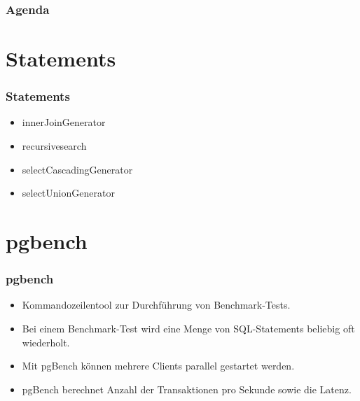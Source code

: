 \documentclass[hyperref={pdfpagelabels=false}]{beamer}
\author{Jennifer Wittling, Rolf Kimmelmann, Jan Löffelsender}
\title{\tit}
\begin{document}

	\begin{frame}
	\titlepage
	\end{frame} 

	\begin{frame}
	\frametitle{Agenda}
	\hypertarget{tableofcontent}{}
	\tableofcontents
	\end{frame}

	\section{Statements}
	\begin{frame}
	\frametitle{Statements}
	\begin{itemize}
		\item innerJoinGenerator
		\item recursivesearch
		\item selectCascadingGenerator
		\item selectUnionGenerator
	\end{itemize}
	\end{frame}

	\section{pgbench}
	\begin{frame}
	\frametitle{pgbench}
    \begin{itemize}
			\item Kommandozeilentool zur Durchführung von Benchmark-Tests.
			\item Bei einem Benchmark-Test wird eine Menge von SQL-Statements beliebig oft wiederholt.
			\item Mit pgBench können mehrere Clients parallel gestartet werden.
			\item pgBench berechnet Anzahl der Transaktionen pro Sekunde sowie die Latenz.
	\end{itemize}	
	\end{frame}
\end{document}
